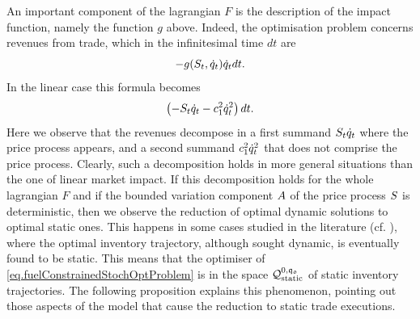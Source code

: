 \documentclass[10pt,a4paper]{article}
\begin{document}
	An important component of the lagrangian $F$ is the description of the impact function, namely the function $g$ above. Indeed, the optimisation problem concerns revenues from trade, which in the infinitesimal time $dt$ are 
	\begin{equation*}
	-g(S_t, \dot{q}_t) \dot{q}_t dt.
	\end{equation*}
	 In the linear case this formula becomes
	 \begin{equation*}
	 \left(-S_t \dot{q}_t - c_{1}^{2} \dot{q}_t^{2} \right) dt.
	 \end{equation*}
	 Here we observe that the revenues decompose in a first summand $S_t \dot{q}_t$ where the price process appears, and a second summand $c_{1}^{2} \dot{q}_t^{2}$ that does not comprise the price process. Clearly, such a decomposition holds in more general situations than the one of linear market impact. If this decomposition holds for the whole lagrangian $F$ and if the bounded variation component $A$ of the price process $S$ is deterministic, then we observe the reduction of optimal dynamic solutions to optimal static ones.   This happens in some cases studied in the literature (cf. \cite[Sections 6.3 and 6.4]{CJP15alg}), where the optimal inventory trajectory, although sought dynamic, is eventually found to be static. This means that the optimiser of \eqref{eq.fuelConstrainedStochOptProblem} is in the space $\mathcal{Q}_{\text{static}}^{0,\mathfrak{q_0}}$ of static inventory trajectories. The following proposition explains this phenomenon, pointing out those aspects of the model that cause the reduction to static trade executions. 
	
\end{document}
